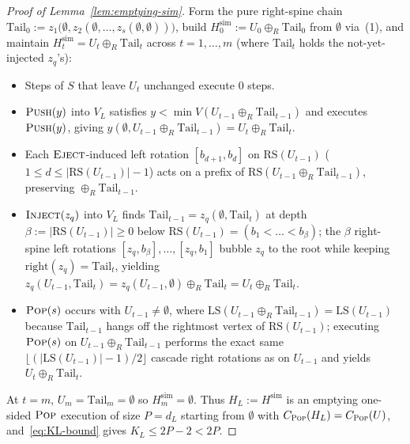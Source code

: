 \documentclass[11pt]{article}
\theoremstyle{definition}
\theoremstyle{remark}
\newcommand{\LS}{\mathrm{LS}}
\newcommand{\RS}{\mathrm{RS}}
\newcommand{\PUSH}{\textnormal{\scshape Push}}
\newcommand{\POP}{\textnormal{\scshape Pop}}
\newcommand{\INJECT}{\textnormal{\scshape Inject}}
\newcommand{\EJECT}{\textnormal{\scshape Eject}}
\begin{document}
\begin{proof}[Proof of Lemma~\ref{lem:emptying-sim}]
Form the pure right-spine chain $\mathrm{Tail}_0 := z_1\big(\emptyset, z_2(\emptyset, \dots, z_s(\emptyset, \emptyset))\big)$, build $H^{\mathrm{sim}}_0 := U_0 \oplus_R \mathrm{Tail}_0$ from $\emptyset$ via~(1), and maintain $H^{\mathrm{sim}}_t = U_t \oplus_R \mathrm{Tail}_t$ across $t = 1, \dots, m$ (where $\mathrm{Tail}_t$ holds the not-yet-injected $z_q$'s):
\begin{itemize}[leftmargin=2em]
  \item Steps of $S$ that leave $U_t$ unchanged execute $0$ steps.
  \item $\PUSH(y)$ into $V_L$ satisfies $y < \min V(U_{t-1} \oplus_R \mathrm{Tail}_{t-1})$ and executes $\PUSH(y)$, giving $y(\emptyset, U_{t-1} \oplus_R \mathrm{Tail}_{t-1}) = U_t \oplus_R \mathrm{Tail}_t$.
  \item Each $\EJECT$-induced left rotation $[b_{d+1}, b_d]$ on $\RS(U_{t-1})$ ($1 \le d \le |\RS(U_{t-1})| - 1$) acts on a prefix of $\RS(U_{t-1} \oplus_R \mathrm{Tail}_{t-1})$, preserving $\oplus_R \mathrm{Tail}_{t-1}$.
  \item $\INJECT(z_q)$ into $V_L$ finds $\mathrm{Tail}_{t-1} = z_q(\emptyset, \mathrm{Tail}_t)$ at depth $\beta := |\RS(U_{t-1})| \ge 0$ below $\RS(U_{t-1}) = (b_1 < \dots < b_\beta)$; the $\beta$ right-spine left rotations $[z_q, b_\beta], \dots, [z_q, b_1]$ bubble $z_q$ to the root while keeping $\mathrm{right}(z_q) = \mathrm{Tail}_t$, yielding $z_q(U_{t-1}, \mathrm{Tail}_t) = z_q(U_{t-1}, \emptyset) \oplus_R \mathrm{Tail}_t = U_t \oplus_R \mathrm{Tail}_t$.
  \item $\POP(s)$ occurs with $U_{t-1} \ne \emptyset$, where $\LS(U_{t-1} \oplus_R \mathrm{Tail}_{t-1}) = \LS(U_{t-1})$ because $\mathrm{Tail}_{t-1}$ hangs off the rightmost vertex of $\RS(U_{t-1})$; executing $\POP(s)$ on $U_{t-1} \oplus_R \mathrm{Tail}_{t-1}$ performs the exact same $\lfloor (|\LS(U_{t-1})| - 1)/2 \rfloor$ cascade right rotations as on $U_{t-1}$ and yields $U_t \oplus_R \mathrm{Tail}_t$.
\end{itemize}
At $t = m$, $U_m = \mathrm{Tail}_m = \emptyset$ so $H^{\mathrm{sim}}_m = \emptyset$. Thus $H_L := H^{\mathrm{sim}}$ is an emptying one-sided $\POP$ execution of size $P = d_L$ starting from $\emptyset$ with $C_{\POP}(H_L) = C_{\POP}(U)$, and~\eqref{eq:KL-bound} gives $K_L \le 2P - 2 < 2P$.
\end{proof}
\end{document}
